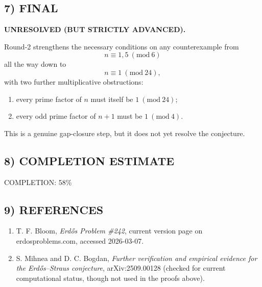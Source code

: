 \subsection*{7) FINAL}
\textbf{UNRESOLVED (BUT STRICTLY ADVANCED).}

Round-2 strengthens the necessary conditions on any counterexample from
\[
 n\equiv 1,5 \ (\mathrm{mod}\ 6)
\]
all the way down to
\[
 n\equiv 1 \ (\mathrm{mod}\ 24),
\]
with two further multiplicative obstructions:
\begin{enumerate}
\item every prime factor of $n$ must itself be $1 \ (\mathrm{mod}\ 24)$;
\item every odd prime factor of $n+1$ must be $1 \ (\mathrm{mod}\ 4)$.
\end{enumerate}
This is a genuine gap-closure step, but it does not yet resolve the conjecture.

\subsection*{8) COMPLETION ESTIMATE}
COMPLETION: 58\%

\subsection*{9) REFERENCES}
\begin{enumerate}
\item T. F. Bloom, \emph{Erd\H{o}s Problem \#242}, current version page on erdosproblems.com, accessed 2026-03-07.
\item S. Mihnea and D. C. Bogdan, \emph{Further verification and empirical evidence for the Erd\H{o}s--Straus conjecture}, arXiv:2509.00128 (checked for current computational status, though not used in the proofs above).
\end{enumerate}

\newpage
